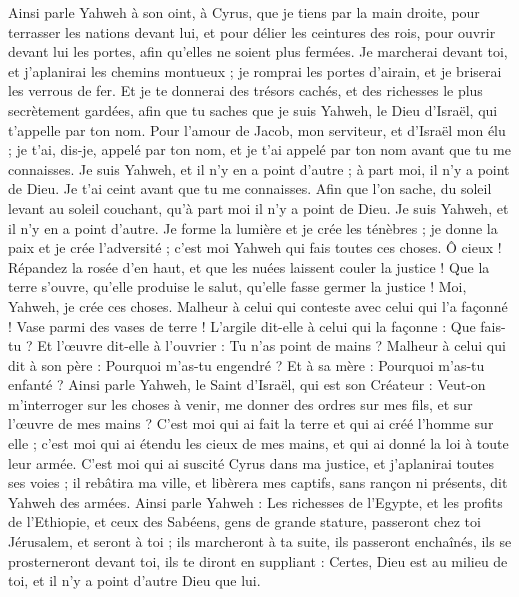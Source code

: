 \begin{multicols}{2}
\VerseOne{}Ainsi parle Yahweh à son oint, à Cyrus,
que je tiens par la main droite, pour terrasser les nations devant lui, et pour délier les ceintures des rois, pour ouvrir devant lui les portes, afin qu'elles ne soient plus fermées.
Je marcherai devant toi, et j'aplanirai les chemins montueux ; je romprai les portes d'airain, et je briserai les verrous de fer. Et je te donnerai des trésors cachés, et des richesses le plus secrètement gardées, afin que tu saches que je suis Yahweh, le Dieu d'Israël, qui t'appelle par ton nom.
Pour l'amour de Jacob, mon serviteur, et d'Israël mon élu ; je t'ai, dis-je, appelé par ton nom, et je t'ai appelé par ton nom avant que tu me connaisses.
Je suis Yahweh, et il n'y en a point d'autre ; à part moi, il n'y a point de Dieu. Je t'ai ceint avant que tu me connaisses.
Afin que l'on sache, du soleil levant au soleil couchant, qu'à part moi il n'y a point de Dieu. Je suis Yahweh, et il n'y en a point d'autre.
Je forme la lumière et je crée les ténèbres ; je donne la paix et je crée l'adversité ; c'est moi Yahweh qui fais toutes ces choses.
Ô cieux ! Répandez la rosée d'en haut, et que les nuées laissent couler la justice ! Que la terre s'ouvre, qu'elle produise le salut, qu'elle fasse germer la justice ! Moi, Yahweh, je crée ces choses.
Malheur à celui qui conteste avec celui qui l'a façonné ! Vase parmi des vases de terre ! L'argile dit-elle à celui qui la façonne : Que fais-tu ? Et l'œuvre dit-elle à l'ouvrier : Tu n'as point de mains ?
Malheur à celui qui dit à son père : Pourquoi m'as-tu engendré ? Et à sa mère : Pourquoi m'as-tu enfanté ?
Ainsi parle Yahweh, le Saint d'Israël, qui est son Créateur : Veut-on m'interroger sur les choses à venir, me donner des ordres sur mes fils, et sur l'œuvre de mes mains ?
C'est moi qui ai fait la terre et qui ai créé l'homme sur elle ; c'est moi qui ai étendu les cieux de mes mains, et qui ai donné la loi à toute leur armée.
C'est moi qui ai suscité Cyrus dans ma justice, et j'aplanirai toutes ses voies ; il rebâtira ma ville, et libèrera mes captifs, sans rançon ni présents, dit Yahweh des armées.
Ainsi parle Yahweh : Les richesses de l'Egypte, et les profits de l'Ethiopie, et ceux des Sabéens, gens de grande stature, passeront chez toi Jérusalem, et seront à toi ; ils marcheront à ta suite, ils passeront enchaînés, ils se prosterneront devant toi, ils te diront en suppliant : Certes, Dieu est au milieu de toi, et il n'y a point d'autre Dieu que lui.

\end{multicols}
